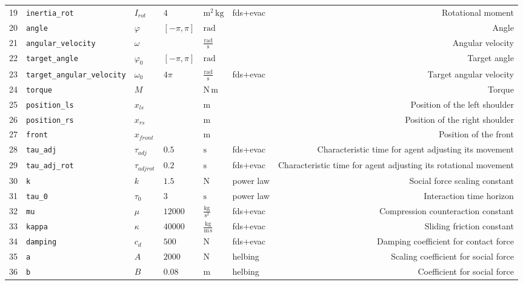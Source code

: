 \begin{tabularx}{\linewidth}{llllllR}
19 &  \verb|inertia_rot| &  $I_{rot}$ &  $4$ &  $\mathrm{m^{2}\,kg}$ &  fds+evac &  Rotational moment \\
20 &  \verb|angle| &  $\varphi$ &  $\left[- \pi, \pi\right]$ &  $\mathrm{rad}$ &   &  Angle \\
21 &  \verb|angular_velocity| &  $\omega$ &   &  $\mathrm{\frac{rad}{s}}$ &   &  Angular velocity \\
22 &  \verb|target_angle| &  $\varphi_{0}$ &  $\left[- \pi, \pi\right]$ &  $\mathrm{rad}$ &   &  Target angle \\
23 &  \verb|target_angular_velocity| &  $\omega_{0}$ &  $4 \pi$ &  $\mathrm{\frac{rad}{s}}$ &  fds+evac &  Target angular velocity \\
24 &  \verb|torque| &  $M$ &   &  $\mathrm{N\,m}$ &   &  Torque \\
25 &  \verb|position_ls| &  $x_{ls}$ &   &  $\mathrm{m}$ &   &  Position of the left shoulder \\
26 &  \verb|position_rs| &  $x_{rs}$ &   &  $\mathrm{m}$ &   &  Position of the right shoulder \\
27 &  \verb|front| &  $x_{front}$ &   &  $\mathrm{m}$ &   &  Position of the front \\
28 &  \verb|tau_adj| &  $\tau_{adj}$ &  $0.5$ &  $\mathrm{s}$ &  fds+evac &  Characteristic time for agent adjusting its  movement \\
29 &  \verb|tau_adj_rot| &  $\tau_{adjrot}$ &  $0.2$ &  $\mathrm{s}$ &  fds+evac &  Characteristic time for agent adjusting its  rotational movement \\
30 &  \verb|k| &  $k$ &  $1.5$ &  $\mathrm{N}$ &  power law &  Social force scaling constant \\
31 &  \verb|tau_0| &  $\tau_{0}$ &  $3$ &  $\mathrm{s}$ &  power law &  Interaction time horizon \\
32 &  \verb|mu| &  $\mu$ &  $12000$ &  $\mathrm{\frac{kg}{s^{2}}}$ &  fds+evac &  Compression counteraction constant \\
33 &  \verb|kappa| &  $\kappa$ &  $40000$ &  $\mathrm{\frac{kg}{m\,s}}$ &  fds+evac &  Sliding friction constant \\
34 &  \verb|damping| &  $c_{d}$ &  $500$ &  $\mathrm{N}$ &  fds+evac &  Damping coefficient for contact force \\
35 &  \verb|a| &  $A$ &  $2000$ &  $\mathrm{N}$ &  helbing &  Scaling coefficient for social force \\
36 &  \verb|b| &  $B$ &  $0.08$ &  $\mathrm{m}$ &  helbing &  Coefficient for social force \\

\end{tabularx}
